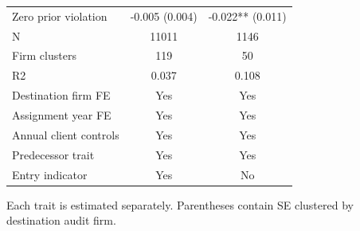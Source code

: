 \begin{table}[!htbp]
{\begin{tabular}{lcc}
Zero prior violation & -0.005 (0.004) & -0.022** (0.011) \\
N & 11011 & 1146 \\
Firm clusters & 119 & 50 \\
R2 & 0.037 & 0.108 \\
Destination firm FE & Yes & Yes \\
Assignment year FE & Yes & Yes \\
Annual client controls & Yes & Yes \\
Predecessor trait & Yes & Yes \\
Entry indicator & Yes & No \\
\bottomrule
\end{tabular}}
\begin{minipage}{\textwidth}\footnotesize Each trait is estimated separately. Parentheses contain SE clustered by destination audit firm.\end{minipage}
\end{table}
